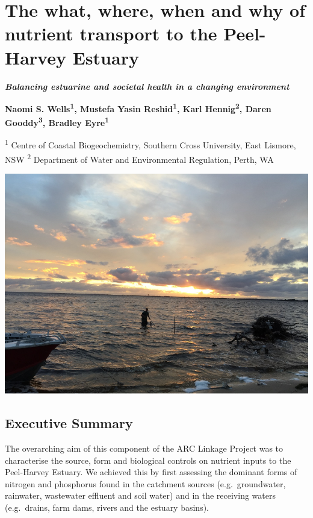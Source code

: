 \documentclass[
]{book}
\begin{document}
\hypertarget{the-what-where-when-and-why-of-nutrient-transport-to-the-peel-harvey-estuary}{%
\chapter{The what, where, when and why of nutrient transport to the Peel-Harvey Estuary}\label{the-what-where-when-and-why-of-nutrient-transport-to-the-peel-harvey-estuary}}

{\textbf{\emph{Balancing estuarine and societal health in a changing environment}}}

{\textbf{Naomi S. Wells\textsuperscript{1}, Mustefa Yasin Reshid\textsuperscript{1}, Karl Hennig\textsuperscript{2}, Daren Gooddy\textsuperscript{3}, Bradley Eyre\textsuperscript{1}}}

{\textsuperscript{1} Centre of Coastal Biogeochemistry, Southern Cross University, East Lismore, NSW \textsuperscript{2} Department of Water and Environmental Regulation, Perth, WA}

\includegraphics[width=1\linewidth]{images/isotopes/picture1}

\hypertarget{executive-summary-4}{%
\section{Executive Summary}\label{executive-summary-4}}

The overarching aim of this component of the ARC Linkage Project was to characterise the source, form and biological controls on nutrient inputs to the Peel-Harvey Estuary. We achieved this by first assessing the dominant forms of nitrogen and phosphorus found in the catchment sources (e.g.~groundwater, rainwater, wastewater effluent and soil water) and in the receiving waters (e.g.~drains, farm dams, rivers and the estuary basins).
\end{document}

